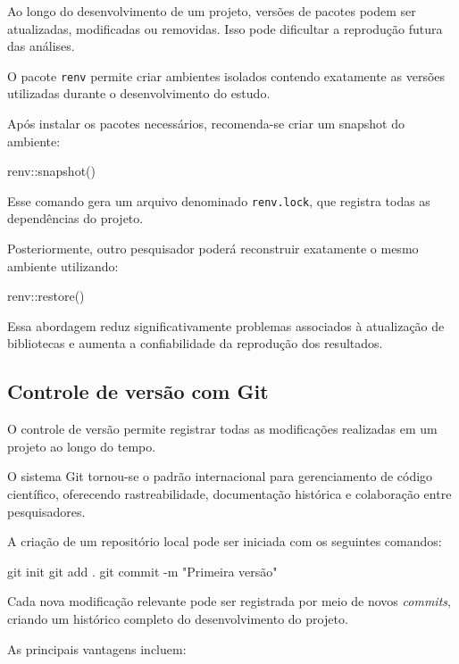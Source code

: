 Ao longo do desenvolvimento de um projeto, versões de pacotes podem ser
atualizadas, modificadas ou removidas. Isso pode dificultar a reprodução futura
das análises.

O pacote \texttt{renv} permite criar ambientes isolados contendo exatamente as
versões utilizadas durante o desenvolvimento do estudo.

Após instalar os pacotes necessários, recomenda-se criar um snapshot do
ambiente:

\begin{rcode}
	renv::snapshot()
\end{rcode}

Esse comando gera um arquivo denominado \texttt{renv.lock}, que registra todas
as dependências do projeto.

Posteriormente, outro pesquisador poderá reconstruir exatamente o mesmo
ambiente utilizando:

\begin{rcode}
	renv::restore()
\end{rcode}

Essa abordagem reduz significativamente problemas associados à atualização de
bibliotecas e aumenta a confiabilidade da reprodução dos resultados.

\subsection{Controle de versão com Git}

O controle de versão permite registrar todas as modificações realizadas em um
projeto ao longo do tempo.

O sistema Git tornou-se o padrão internacional para gerenciamento de código
científico, oferecendo rastreabilidade, documentação histórica e colaboração
entre pesquisadores.

A criação de um repositório local pode ser iniciada com os seguintes comandos:

\begin{shellcode}
	git init
	git add .
	git commit -m "Primeira versão"
\end{shellcode}

Cada nova modificação relevante pode ser registrada por meio de novos
\textit{commits}, criando um histórico completo do desenvolvimento do projeto.

As principais vantagens incluem:

